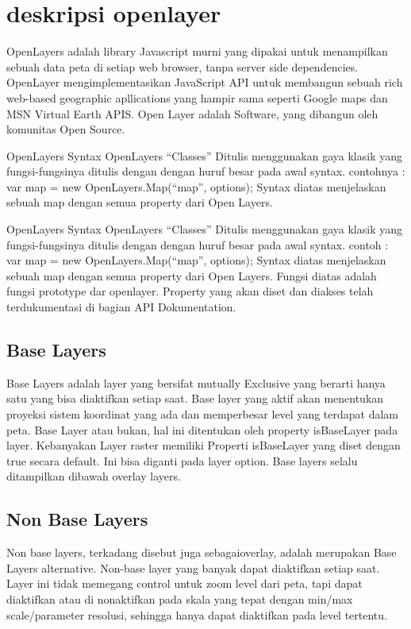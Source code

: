 

\section{deskripsi openlayer}
OpenLayers adalah library Javascript murni yang dipakai untuk menampilkan sebuah data peta di setiap web browser, tanpa server side dependencies.
OpenLayer mengimplementasikan JavaScript API untuk membangun sebuah rich web-based geographic apllications yang hampir sama seperti Google maps dan MSN Virtual Earth APIS.
Open Layer adalah Software, yang dibangun oleh komunitas Open Source.
  
OpenLayers Syntax
OpenLayers “Classes”
Ditulis menggunakan gaya klasik yang fungsi-fungsinya ditulis dengan dengan huruf besar pada awal syntax.
contohnya : var map = new OpenLayers.Map(“map”, options);
Syntax diatas menjelaskan sebuah map dengan semua property dari Open Layers. 
  

  OpenLayers Syntax
  OpenLayers “Classes”
  Ditulis menggunakan gaya klasik yang fungsi-fungsinya ditulis dengan dengan huruf besar pada awal syntax.
  contoh : var map = new OpenLayers.Map(“map”, options);
  Syntax diatas menjelaskan sebuah map dengan semua property dari Open Layers.
  Fungsi diatas adalah fungsi prototype dar openlayer. Property yang akan diset dan diakses telah terdukumentasi di bagian API   Dokumentation.

\subsection{Base Layers}
 Base Layers adalah layer yang bersifat mutually Exclusive yang berarti hanya satu yang bisa diaktifkan setiap saat.
 Base layer yang aktif akan menentukan proyeksi sistem koordinat yang ada dan memperbesar level yang terdapat dalam peta. 
 Base Layer atau bukan, hal ini ditentukan oleh property isBaseLayer pada layer. Kebanyakan Layer raster memiliki Properti isBaseLayer yang diset dengan true secara default. 
 Ini bisa diganti pada layer option. Base layers selalu ditampilkan dibawah overlay layers.

\subsection{Non Base Layers}
Non base layers, terkadang disebut juga sebagaioverlay, adalah merupakan Base Layers alternative. Non-base layer yang banyak dapat diaktifkan setiap saat.
Layer ini tidak memegang control untuk zoom level dari peta, tapi dapat diaktifkan atau di nonaktifkan pada skala yang tepat dengan min/max scale/parameter resolusi, sehingga hanya dapat diaktifkan pada level tertentu.

